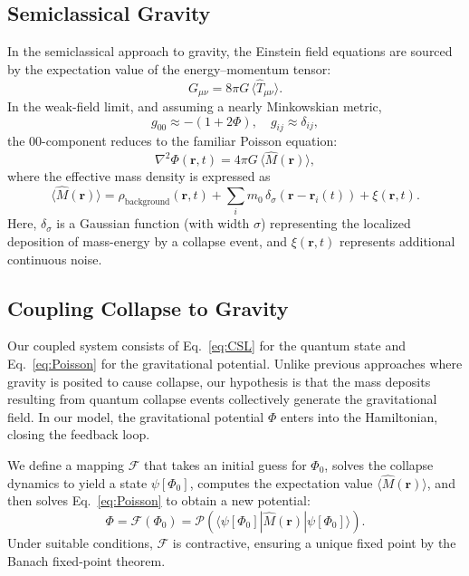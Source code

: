 \documentclass[11pt,a4paper]{article}
\begin{document}
\subsection{Semiclassical Gravity}
In the semiclassical approach to gravity, the Einstein field equations are sourced by the expectation value of the energy--momentum tensor:
\begin{equation} \label{eq:Einstein}
G_{\mu\nu} = 8\pi G\, \langle \hat{T}_{\mu\nu} \rangle.
\end{equation}
In the weak-field limit, and assuming a nearly Minkowskian metric,
\[
g_{00} \approx -(1+2\Phi), \quad g_{ij} \approx \delta_{ij},
\]
the $00$-component reduces to the familiar Poisson equation:
\begin{equation} \label{eq:Poisson}
\nabla^2 \Phi(\mathbf{r},t) = 4\pi G\,\langle \hat{M}(\mathbf{r}) \rangle,
\end{equation}
where the effective mass density is expressed as
\begin{equation} \label{eq:massdensity}
\langle \hat{M}(\mathbf{r}) \rangle = \rho_{\text{background}}(\mathbf{r},t) + \sum_i m_0\,\delta_\sigma(\mathbf{r}-\mathbf{r}_i(t)) + \xi(\mathbf{r},t).
\end{equation}
Here, $\delta_\sigma$ is a Gaussian function (with width $\sigma$) representing the localized deposition of mass-energy by a collapse event, and $\xi(\mathbf{r},t)$ represents additional continuous noise.

\subsection{Coupling Collapse to Gravity}
Our coupled system consists of Eq.~\eqref{eq:CSL} for the quantum state and Eq.~\eqref{eq:Poisson} for the gravitational potential. Unlike previous approaches where gravity is posited to cause collapse, our hypothesis is that the mass deposits resulting from quantum collapse events collectively generate the gravitational field. In our model, the gravitational potential $\Phi$ enters into the Hamiltonian, closing the feedback loop.

We define a mapping $\mathcal{F}$ that takes an initial guess for $\Phi_0$, solves the collapse dynamics to yield a state $\psi[\Phi_0]$, computes the expectation value $\langle \hat{M}(\mathbf{r}) \rangle$, and then solves Eq.~\eqref{eq:Poisson} to obtain a new potential:
\begin{equation}
\Phi = \mathcal{F}(\Phi_0) = \mathcal{P}\left(\langle \psi[\Phi_0]|\hat{M}(\mathbf{r})|\psi[\Phi_0]\rangle\right).
\end{equation}
Under suitable conditions, $\mathcal{F}$ is contractive, ensuring a unique fixed point by the Banach fixed-point theorem.
\end{document}
